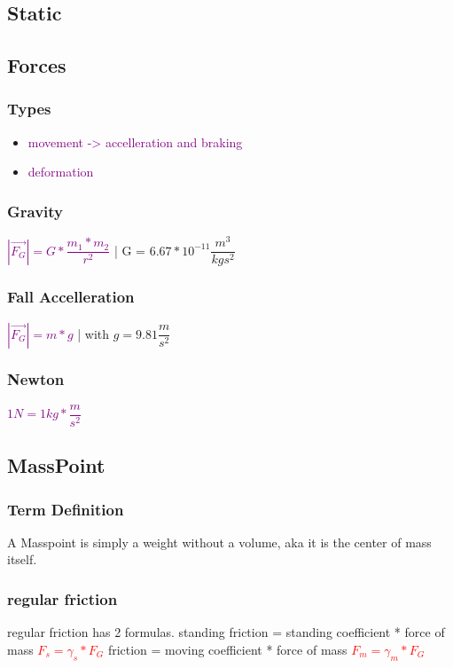 \documentclass[main.tex,fontsize=8pt,paper=a4,paper=portrait,DIV=calc,]{scrartcl}
\begin{document}
\begin{multicols*}{2}
\section{Static}
\subsection{Forces}
\subsubsection{Types}
\vspace{2mm}
\begin{itemize}
\item \textcolor{purple}{movement -> accelleration and braking}
\item \textcolor{purple}{deformation}

\end{itemize}

\subsubsection{Gravity}
\textcolor{purple}{\( |\vec{F_G}| = G * \dfrac{m_1 * m_2}{r^2} \)} | 
G = \(6.67 * 10^{-11}\dfrac{m^3}{kgs^2}\)\vspace{2mm}

\subsubsection{Fall Accelleration}
\textcolor{purple}{\(|\vec{F_G}| = m * g\)} | with \(g = 9.81\dfrac{m}{s^2}\)

\subsubsection{Newton}
\textcolor{purple}{\(1N = 1kg * \dfrac{m}{s^2}\)}\vspace{2mm}

\subsection{MassPoint}
\subsubsection{Term Definition} 
A Masspoint is simply a weight without a volume, aka it is the center of mass itself.

\subsubsection{regular friction}
regular friction has 2 formulas. \newline
standing friction = standing coefficient * force of mass \newline
\large \textcolor{red}{\(F_{s} = \gamma_s * F_G\)}\newline 
\normalsize friction = moving coefficient * force of mass \newline 
\large\textcolor{red}{\(F_{m} = \gamma_m * F_G\)} \normalsize\newline
{}


\end{multicols*}
\end{document}
